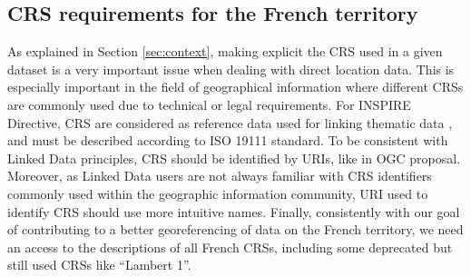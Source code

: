 \subsection{CRS requirements for the  French territory} \label{sec:reqs}

As explained in Section \ref{sec:context}, making explicit the CRS used in a given dataset is a very important issue when dealing with direct location data. This is especially important in the field of geographical information where different CRSs are commonly used due to technical or legal requirements. For INSPIRE Directive, CRS are considered as reference data used for linking thematic data \cite{inspire2009}, and must be described according to ISO 19111 standard. To be consistent with Linked Data principles, CRS should be identified by URIs, like in OGC proposal. Moreover, as Linked Data users are not always familiar with CRS identifiers commonly used within the geographic information community, URI used to identify CRS should use more intuitive names. Finally, consistently with our goal of contributing to a better georeferencing of data on the French territory, we need an access to the descriptions of all French CRSs, including some deprecated but still used CRSs like ``Lambert 1''.

\begin{table}[!htp]
\end{table}

